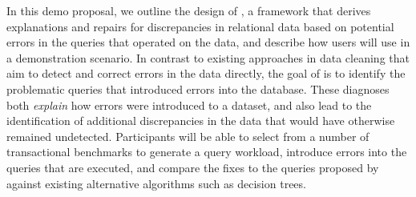 In this demo proposal, we outline the design of \sys, a framework that derives explanations
and repairs for discrepancies in relational data based on potential errors in
the queries that operated on the data, and describe how users will use \sys
in a demonstration scenario. 
In contrast to existing approaches in data
cleaning that aim to detect and correct errors in the data directly, the goal
of \sys is to identify  the problematic queries that introduced errors into the
database. These diagnoses both \emph{explain} how errors were introduced to a
dataset, and also lead to the identification of additional discrepancies in
the data that would have otherwise remained undetected.
Participants will be able to 
select from a number of transactional benchmarks to generate a query workload,
introduce errors into the queries that are executed,
and compare the fixes to the queries proposed by \sys against existing alternative algorithms such as decision trees.



% 





